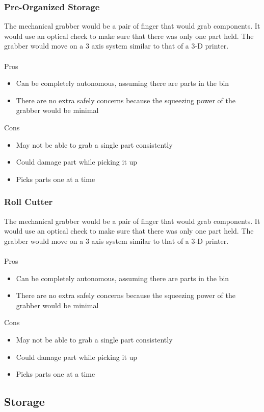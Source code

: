 \documentclass[12pt]{report}
\begin{document}
\subsubsection*{Pre-Organized Storage}
The mechanical grabber would be a pair of finger that would grab components. It would use an optical check to make sure that there was only one part held. The grabber would move on a 3 axis system similar to that of a 3-D printer. \\ \\
Pros
\begin{itemize}
\item Can be completely autonomous, assuming there are parts in the bin
\item There are no extra safely concerns because the squeezing power of the grabber would be minimal
\end{itemize}
Cons
\begin{itemize}
\item May not be able to grab a single part consistently
\item Could damage part while picking it up
\item Picks parts one at a time
\end{itemize}

\subsubsection*{Roll Cutter}
The mechanical grabber would be a pair of finger that would grab components. It would use an optical check to make sure that there was only one part held. The grabber would move on a 3 axis system similar to that of a 3-D printer. \\ \\
Pros
\begin{itemize}
\item Can be completely autonomous, assuming there are parts in the bin
\item There are no extra safely concerns because the squeezing power of the grabber would be minimal
\end{itemize}
Cons
\begin{itemize}
\item May not be able to grab a single part consistently
\item Could damage part while picking it up
\item Picks parts one at a time
\end{itemize}

\subsection*{Storage}
\end{document}

